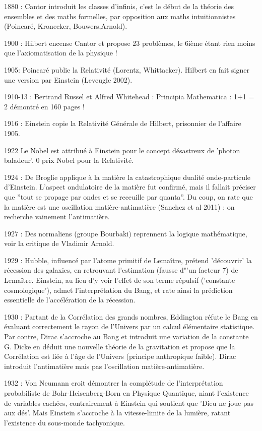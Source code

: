 \documentclass[a4paper,12pt]{article}
\begin{document}
1880 : Cantor introduit les classes d'infinis, c'est le début de la théorie des ensembles et des maths formelles, par opposition aux maths intuitionnistes (Poincaré, Kronecker, Bouwers,Arnold).

1900 : Hilbert encense Cantor et propose 23 problèmes, le 6ième étant rien moins que l'axiomatisation de la physique !

1905: Poincaré publie la Relativité (Lorentz, Whittacker). Hilbert en fait signer une version par Einstein (Leveugle 2002).  

1910-13 : Bertrand Russel et Alfred Whitehead : Principia Mathematica : 1+1 = 2 démontré en 160 pages ! 

1916 : Einstein copie la Relativité Générale de Hilbert, prisonnier de l'affaire 1905.

1922 Le Nobel est attribué à Einstein pour le concept désastreux de 'photon baladeur'. 0 prix Nobel pour la Relativité.

1924 : De Broglie applique à la matière la catastrophique dualité onde-particule d'Einstein. L'aspect ondulatoire de la matière fut confirmé, mais il fallait préciser que ''tout se propage par ondes et se receuille par quanta''. Du coup, on rate que la matière est une oscillation matière-antimatière (Sanchez et al 2011) : on recherche vainement l'antimatière.

1927 : Des normaliens (groupe Bourbaki) reprennent la logique mathématique, voir la critique de Vladimir Arnold.

1929 : Hubble, influencé par l'atome primitif de Lemaître, prétend 'découvrir' la récession des galaxies, en retrouvant l'estimation (fausse d"'un facteur 7) de Lema\^itre. Einstein, au lieu d'y voir l'effet de son terme répulsif ('constante cosmologique'), admet l'interprétation du Bang, et rate ainsi la prédiction essentielle de l'accélération de la récession.

1930 : Partant de la Corrélation des grands nombres, Eddington réfute le Bang en évaluant correctement le rayon de l'Univers par un calcul élémentaire statistique. Par contre, Dirac s'accroche au Bang et introduit une variation de la constante G. Dicke en déduit une nouvelle théorie de la gravitation et propose que la Corrélation est liée à l'âge de l'Univers (principe anthropique faible). Dirac introduit l'antimatière mais pas l'oscillation matière-antimatière.

1932 : Von Neumann croit démontrer la complétude de l'interprétation probabiliste de Bohr-Heisenberg-Born en Physique Quantique, niant l'existence de variables cachées, contrairement à Einstein qui soutient que 'Dieu ne joue pas aux dés'. Mais Einstein s'accroche à la vitesse-limite de la lumière, ratant l'existence du sous-monde tachyonique.
\end{document}
